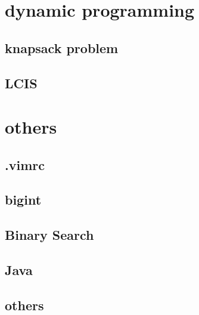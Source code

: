 \documentclass[a4paper,5pt,twocolumn,titlepage]{article}
\begin{document}
\section{dynamic programming}
\subsection{knapsack problem}

\subsection{LCIS}


\section{others}
\subsection{.vimrc}

\subsection{bigint}

\subsection{Binary Search}

\subsection{Java}

\subsection{others}

\end{document}
